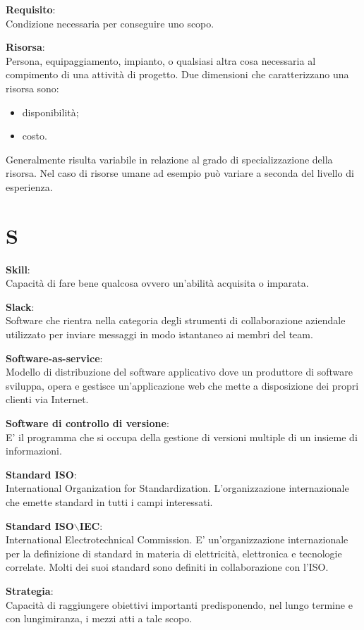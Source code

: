 \documentclass[a4paper, oneside, openany, dvipsnames, table]{article}
\begin{document}
\textbf{Requisito}:\\	Condizione necessaria per conseguire uno scopo.

\textbf{Risorsa}:\\	Persona, equipaggiamento, impianto, o qualsiasi altra cosa necessaria al compimento di una attività di progetto. Due dimensioni che caratterizzano una risorsa sono:
\begin{itemize}
\item disponibilità;
\item costo.
\end{itemize} 
Generalmente risulta variabile in relazione al grado di specializzazione della risorsa. Nel caso di risorse umane ad esempio può variare a seconda del livello di esperienza.


\newpage
\section{S}
\textbf{Skill}:\\	Capacità di fare bene qualcosa ovvero un'abilità acquisita o imparata.

\textbf{Slack}:\\	Software che rientra nella categoria degli strumenti di collaborazione aziendale utilizzato per inviare messaggi in modo istantaneo ai membri del team.

\textbf{Software-as-service}:\\	Modello di distribuzione del software applicativo dove un produttore di software sviluppa, opera e gestisce un'applicazione web che mette a disposizione dei propri clienti via Internet.

\textbf{Software di controllo di versione}:\\ E' il programma che si occupa della  gestione di versioni multiple di un insieme di informazioni.

\textbf{Standard ISO}:\\	International Organization for Standardization. L'organizzazione internazionale che emette standard in tutti i campi interessati.

\textbf{Standard ISO$\backslash$IEC}:\\	International Electrotechnical Commission. E' un'organizzazione internazionale per la definizione di standard in materia di elettricità, elettronica e tecnologie correlate. Molti dei suoi standard sono definiti in collaborazione con l'ISO.

\textbf{Strategia}:\\	Capacità di raggiungere obiettivi importanti predisponendo, nel lungo termine e con lungimiranza, i mezzi atti a tale scopo.
\end{document}
